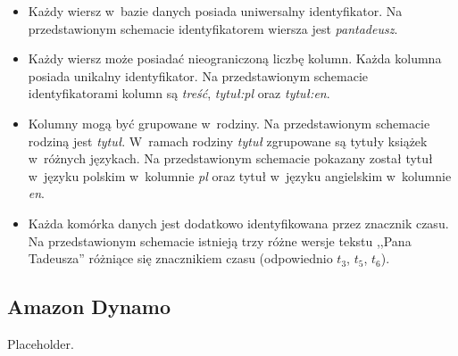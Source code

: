\begin{itemize}
	\item Każdy wiersz w~bazie danych posiada uniwersalny identyfikator. Na przedstawionym schemacie identyfikatorem wiersza jest \emph{pantadeusz}.
	\item Każdy wiersz może posiadać nieograniczoną liczbę kolumn. Każda kolumna posiada unikalny identyfikator. Na przedstawionym schemacie identyfikatorami kolumn są \emph{treść}, \emph{tytuł:pl} oraz \emph{tytuł:en}.
	\item Kolumny mogą być grupowane w~rodziny. Na przedstawionym schemacie rodziną jest \emph{tytuł}. W~ramach rodziny \emph{tytuł} zgrupowane są tytuły książek w~różnych językach. Na przedstawionym schemacie pokazany został tytuł w~języku polskim w~kolumnie \emph{pl} oraz tytuł w~języku angielskim w~kolumnie \emph{en}.
	\item Każda komórka danych jest dodatkowo identyfikowana przez znacznik czasu. Na przedstawionym schemacie istnieją trzy różne wersje tekstu ,,Pana Tadeusza'' różniące się znacznikiem czasu (odpowiednio $t_3$, $t_5$, $t_6$).
\end{itemize}

\subsection{Amazon Dynamo}

Placeholder.
